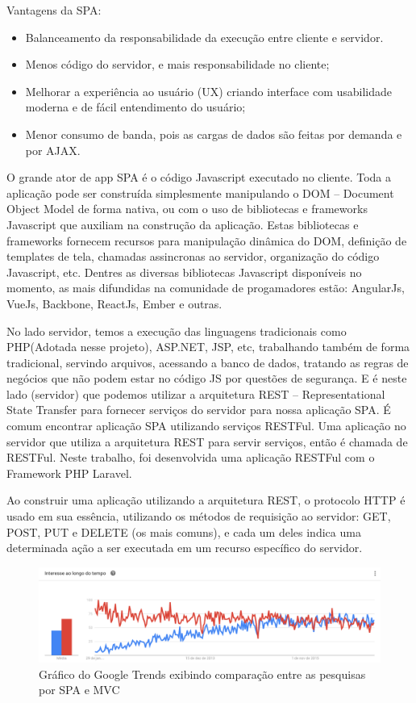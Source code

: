 Vantagens da SPA:
\begin{itemize}

\item Balanceamento da responsabilidade da execução entre cliente e servidor.
\item Menos código do servidor, e mais responsabilidade no cliente;
\item Melhorar a experiência ao usuário (UX) criando interface com usabilidade moderna e de fácil entendimento do usuário;
\item Menor consumo de banda, pois as cargas de dados são feitas por demanda e por AJAX.

\end{itemize}
O grande ator de app SPA é o código Javascript executado no cliente. Toda a aplicação pode ser construída simplesmente manipulando o DOM – Document Object Model de forma nativa, ou com o uso de bibliotecas e frameworks Javascript que auxiliam na construção da aplicação. Estas bibliotecas e frameworks fornecem recursos para manipulação dinâmica do DOM, definição de templates de tela, chamadas assincronas ao servidor, organização do código Javascript, etc. Dentres as diversas bibliotecas Javascript disponíveis no momento, as mais difundidas na comunidade de progamadores estão: AngularJs, VueJs, Backbone, ReactJs, Ember e outras.


No lado servidor, temos a execução das linguagens tradicionais como PHP(Adotada nesse projeto), ASP.NET, JSP, etc, trabalhando também de forma tradicional, servindo arquivos, acessando a banco de dados, tratando as regras de negócios que não podem estar no código JS por questões de segurança. E é neste lado (servidor) que podemos utilizar a arquitetura REST – Representational State Transfer para fornecer serviços do servidor para nossa aplicação SPA. É comum encontrar aplicação SPA utilizando serviços RESTFul. Uma aplicação no servidor que utiliza a arquitetura REST para servir serviços, então é chamada de RESTFul. Neste trabalho, foi desenvolvida uma aplicação RESTFul com o Framework PHP Laravel.


Ao construir uma aplicação utilizando a arquitetura REST, o protocolo HTTP é usado em sua essência, utilizando os métodos de requisição ao servidor: GET, POST, PUT e DELETE (os mais comuns), e cada um deles indica uma determinada ação a ser executada em um recurso específico do servidor.


\begin{figure}
	\label{fig:spa}
	\includegraphics[width=1\textwidth]{img/spa-mvc}
	\caption{Gráfico do Google Trends exibindo comparação entre as pesquisas por SPA e MVC}
\end{figure}


